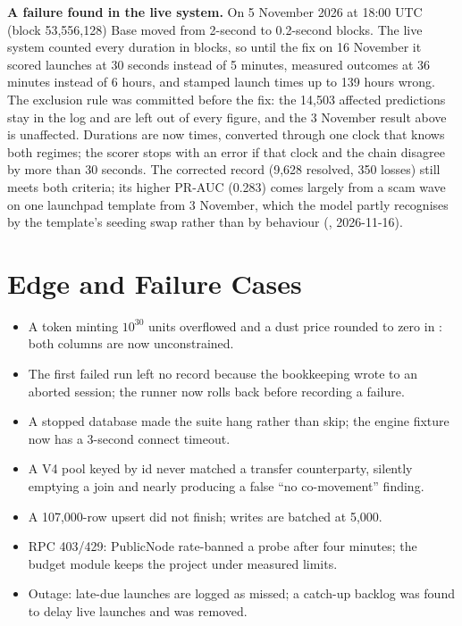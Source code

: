 \textbf{A failure found in the live system.} On 5 November 2026 at 18:00 UTC (block 53,556,128) Base moved from 2-second to 0.2-second blocks. The live system counted every duration in blocks, so until the fix on 16 November it scored launches at 30 seconds instead of 5 minutes, measured outcomes at 36 minutes instead of 6 hours, and stamped launch times up to 139 hours wrong. The exclusion rule was committed before the fix: the 14,503 affected predictions stay in the log and are left out of every figure, and the 3 November result above is unaffected. Durations are now times, converted through one clock that knows both regimes; the scorer stops with an error if that clock and the chain disagree by more than 30 seconds. The corrected record (9,628 resolved, 350 losses) still meets both criteria; its higher PR-AUC (0.283) comes largely from a scam wave on one launchpad template from 3 November, which the model partly recognises by the template's seeding swap rather than by behaviour (, 2026-11-16).

\section{Edge and Failure Cases}
\begin{itemize}
  \item A token minting $10^{30}$ units overflowed  and a dust price rounded to zero in : both columns are now unconstrained.
  \item The first failed run left no record because the bookkeeping wrote to an aborted session; the runner now rolls back before recording a failure.
  \item A stopped database made the suite hang rather than skip; the engine fixture now has a 3-second connect timeout.
  \item A V4 pool keyed by id never matched a transfer counterparty, silently emptying a join and nearly producing a false ``no co-movement'' finding.
  \item A 107,000-row upsert did not finish; writes are batched at 5,000.
  \item RPC 403/429: PublicNode rate-banned a probe after four minutes; the budget module keeps the project under measured limits.
  \item Outage: late-due launches are logged as missed; a catch-up backlog was found to delay live launches and was removed.
\end{itemize}

